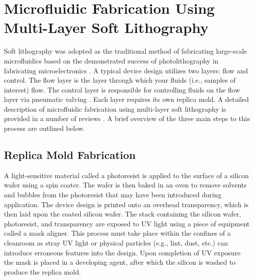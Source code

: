 \section{Microfluidic Fabrication Using Multi-Layer Soft Lithography}
\label{ssec:backgroundSL}
Soft lithography was adopted as the traditional method of fabricating large-scale microfluidics based on the demonstrated success of photolithography in fabricating microelectronics \cite{whitesides2006}. A typical device design utilizes two layers: flow and control. The flow layer is the layer through which your fluids (i.e., samples of interest) flow. The control layer is responsible for controlling fluids on the flow layer via pneumatic valving \cite{unger2000}. Each layer requires its own replica mold. A detailed description of microfluidic fabrication using multi-layer soft lithography is provided in a number of reviews \cite{duffy1998}\cite{sia2003}\cite{weibel2007}. A brief overview of the three main steps to this process are outlined below.

\subsection{Replica Mold Fabrication}
A light-sensitive material called a photoresist is applied to the surface of a silicon wafer using a spin coater. The wafer is then baked in an oven to remove solvents and bubbles from the photoresist that may have been introduced during application. The device design is printed onto an overhead transparency, which is then laid upon the coated silicon wafer. The stack containing the silicon wafer, photoresist, and transparency are exposed to UV light using a piece of equipment called a mask aligner. This process must take place within the confines of a cleanroom as stray UV light or physical particles (e.g., lint, dust, etc.) can introduce erroneous features into the design. Upon completion of UV exposure the mask is placed in a developing agent, after which the silicon is washed to produce the replica mold.

